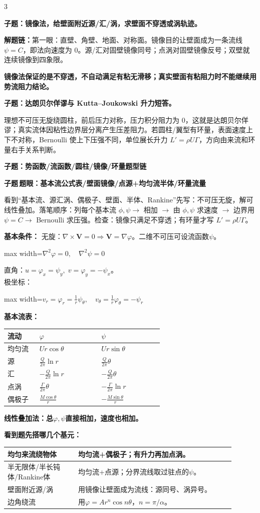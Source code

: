 \documentclass[a4paper]{article}
\newcommand{\qt}[1]{\vspace{0.04pt}\colorbox{Q}{\parbox{\dimexpr\linewidth-2\fboxsep}{\color{white}\bfseries #1}}\par}
\newcommand{\ans}[1]{\colorbox{G}{\parbox{\dimexpr\linewidth-2\fboxsep}{#1}}\par}
\newcommand{\warn}[1]{\colorbox{Y}{\parbox{\dimexpr\linewidth-2\fboxsep}{\color{E}\bfseries #1}}\par}
\newcommand{\chain}[1]{{\color{A}\bfseries 解题链：}#1\par}
\newcommand{\sect}[1]{\par{\bfseries\color{Q}#1：}}
\newcommand{\fml}[1]{\begin{adjustbox}{max width=\linewidth}$\displaystyle #1$\end{adjustbox}}
\newcommand{\labtag}[3]{{\bfseries\color{#1}\colorbox{#1}{\color{white}\fontsize{2.18}{2.28}\selectfont #2}\,#3}\par}
\newcommand{\subt}[1]{\labtag{Q}{子题}{#1}}
\newcommand{\schemepotential}{}
\newcommand{\subq}[1]{\subt{#1}}
\begin{document}
\begin{multicols}{3}
\qt{子题：镜像法，给壁面附近源/汇/涡，求壁面不穿透或涡轨迹。}
\chain{第一眼：直壁、角壁、地面、对称面。镜像目的让壁面成为一条流线 $\psi=C$，即法向速度为 0。源/汇对固壁镜像同号；点涡对固壁镜像反号；双壁就连续镜像到四象限。}
\warn{镜像法保证的是不穿透，不自动满足有粘无滑移；真实壁面有粘阻力时不能继续用势流阻力结论。}

\qt{子题：达朗贝尔佯谬与 Kutta--Joukowski 升力短答。}
\ans{理想不可压无旋绕圆柱，前后压力对称，压力积分阻力为 0，这就是达朗贝尔佯谬；真实流体因粘性边界层分离产生压差阻力。若圆柱/翼型有环量，表面速度上下不对称，Bernoulli 使上下压强不同，单位展长升力 $L'=\rho U\Gamma$，方向由来流和环量右手关系判断。}


\qt{子题：势函数/流函数/圆柱/镜像/环量题型链}
{\fontsize{2.66}{2.82}\selectfont
\schemepotential
\subq{题眼：基本流公式表/壁面镜像/点源+均匀流半体/环量流量}
看到“基本流、源汇涡、偶极子、壁面、半体、Rankine”先写：不可压无旋，解可线性叠加。落笔顺序：列每个基本流 $\phi,\psi\to$ 相加 $\to$ 由 $\phi,\psi$ 求速度 $\to$ 边界用 $\psi=C\to$ Bernoulli 求压强。检查：镜像只满足不穿透；有环量才写 $L'=\rho U\Gamma$。
\sect{基本条件}
无旋：$\nabla\times\bm V=0\Rightarrow \bm V=\nabla\varphi$。二维不可压可设流函数$\psi$。\\
\fml{\nabla^2\varphi=0,\quad \nabla^2\psi=0}
直角：$u=\varphi_x=\psi_y,\;v=\varphi_y=-\psi_x$。\\
极坐标：\fml{v_r=\varphi_r=\frac1r\psi_\theta,\quad v_\theta=\frac1r\varphi_\theta=-\psi_r}

\sect{基本流表}
\renewcommand{\arraystretch}{0.76}\begin{tabular}{|p{0.18\linewidth}|p{0.35\linewidth}|p{0.35\linewidth}|}
\hline 流动 & $\varphi$ & $\psi$\\ \hline
均匀流 & $Ur\cos\theta$ & $Ur\sin\theta$\\ \hline
源 & $\frac{Q}{2\pi}\ln r$ & $\frac{Q}{2\pi}\theta$\\ \hline
汇 & $-\frac{Q}{2\pi}\ln r$ & $-\frac{Q}{2\pi}\theta$\\ \hline
点涡 & $\frac{\Gamma}{2\pi}\theta$ & $-\frac{\Gamma}{2\pi}\ln r$\\ \hline
偶极子 & $\frac{M\cos\theta}{r}$ & $-\frac{M\sin\theta}{r}$\\ \hline
\end{tabular}\renewcommand{\arraystretch}{1}
\warn{线性叠加法：总$\varphi,\psi$直接相加，速度也相加。}
\sect{看到题先搭哪几个基元}
\renewcommand{\arraystretch}{0.70}\begin{tabular}{|p{0.28\linewidth}|p{0.62\linewidth}|}
\hline 均匀来流绕物体 & 均匀流+偶极子；有升力再加点涡。\\ \hline
半无限体/半长钝体/Rankine体 & 均匀流+点源；分界流线取过驻点的$\psi$。\\ \hline
壁面附近源/涡 & 用镜像让壁面成为流线：源同号、涡异号。\\ \hline
边角绕流 & 用$\varphi=Ar^n\cos n\theta$，$n=\pi/\alpha$。\\ \hline
\end{tabular}\renewcommand{\arraystretch}{1}

}
\end{multicols}
\end{document}
